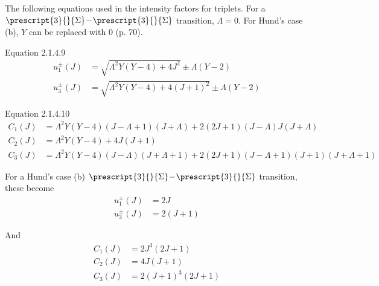 \documentclass[11pt, twoside, fleqn]{report}
\newcommand{\dash}{\!-\!}
\newcommand{\state}[2]{\prescript{#1}{}{#2}}
\begin{document}
    The following equations used in the intensity factors for triplets. For a $\state{3}{\Sigma}\dash\state{3}{\Sigma}$ transition, $\Lambda = 0$. For Hund's case (b), $Y$ can be replaced with $0$ (p. 70).

    Equation 2.1.4.9
    \begin{align*}
        u_1^{\pm}(J) & = \sqrt{\Lambda^2Y(Y - 4) + 4J^2} \pm \Lambda(Y - 2)       \\
        u_3^{\pm}(J) & = \sqrt{\Lambda^2Y(Y - 4) + 4(J + 1)^2} \pm \Lambda(Y - 2)
    \end{align*}

    Equation 2.1.4.10
    \begin{align*}
        C_1(J) & = \Lambda^2Y(Y - 4)(J - \Lambda + 1)(J + \Lambda) + 2(2J + 1)(J - \Lambda)J(J + \Lambda)               \\
        C_2(J) & = \Lambda^2Y(Y - 4) + 4J(J + 1)                                                                        \\
        C_3(J) & = \Lambda^2Y(Y - 4)(J - \Lambda)(J + \Lambda + 1) + 2(2J + 1)(J - \Lambda + 1)(J + 1)(J + \Lambda + 1)
    \end{align*}

    For a Hund's case (b) $\state{3}{\Sigma}\dash\state{3}{\Sigma}$ transition, these become
    \begin{align*}
        u_1^{\pm}(J) & = 2J       \\
        u_3^{\pm}(J) & = 2(J + 1)
    \end{align*}

    And
    \begin{align*}
        C_1(J) & = 2J^3(2J + 1)       \\
        C_2(J) & = 4J(J + 1)            \\
        C_3(J) & = 2(J + 1)^3(2J + 1)
    \end{align*}
\end{document}
